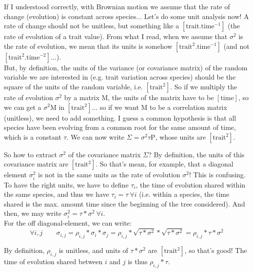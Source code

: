 \documentclass{article}
\newcommand{\Rho}{\mathrm{P}}
\begin{document}
\noindent If I understood correctly, with Brownian motion we assume that the rate of change (evolution) is constant across species... Let's do some unit analysis now! A rate of change should not be unitless, but something like a $[\mathrm{trait.time}^{-1}]$ (the rate of evolution of a trait value). From what I read, when we assume that $\sigma^2$ is the rate of evolution, we mean that its units is somehow $[\mathrm{trait}^2.\mathrm{time}^{-1}]$ (and not $[\mathrm{trait}^2.\mathrm{time}^{-2}]$...). \\
But, by definition, the units of the variance (or covariance matrix) of the random variable we are interested in (e.g. trait variation across species)  should be the square of the units of the random variable, i.e. $[\mathrm{trait}^2]$. So if we multiply the rate of evolution $\sigma^2$ by a matrix $\mathrm{M}$, the units of the matrix have to be $[\mathrm{time}]$, so we can get a $\sigma^2\mathrm{M}$ in $[\mathrm{trait}^2]$... so if we want $\mathrm{M}$ to be a correlation matrix (unitless), we need to add something. I guess a common hypothesis is that all species have been evolving from a common root for the same amount of time, which is a constant $\tau$. We can now write $\Sigma = \sigma^2 \tau \Rho$, whose units are $[\mathrm{trait}^2]$.
\vspace{0.25cm}

\noindent So how to extract $\sigma^2$ of the covariance matrix $\Sigma$? By definition, the units of this covariance matrix are $[\mathrm{trait}^2]$.
So that's mean, for example, that a diagonal element $\sigma^2_{i}$ is not in the same units as the rate of evolution $\sigma^2$! This is confusing. To have the right units, we have to define $\tau_i$, the time of evolution shared within the same species, and thus we have  $\tau_i = \tau ~\forall i$ (i.e. within a species, the time shared is the max. amount time since the beginning of the tree considered). And then, we may write $\sigma^2_{i}=\tau*\sigma^2 ~\forall i$.\\
For the off diagonal-element, we can write: 
$$\forall i,j \qquad \sigma_{i,j}=\rho_{i,j}*\sigma_{i}*\sigma_{j}=\rho_{i,j}*\sqrt{\tau*\sigma^2}*\sqrt{\tau*\sigma^2}=\rho_{i,j}*\tau*\sigma^2 $$

\noindent By definition, $\rho_{i,j}$ is unitless, and units of $\tau*\sigma^2$ are $[\mathrm{trait}^2]$, so that's good! The time of evolution shared between $i$ and $j$ is thus $\rho_{i,j}*\tau$.
\vspace{0.25cm}
\end{document}
